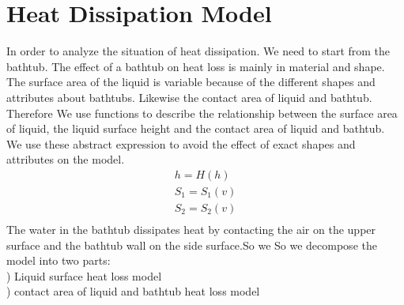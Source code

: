 \documentclass{mcmthesis}
\begin{document}
\section{Heat Dissipation Model}
In order to analyze the situation of heat dissipation. 
We need to start from the bathtub.
The effect of a bathtub on heat loss is mainly in material and shape.\\
\indent The surface area of the liquid is variable because of the different shapes and attributes about bathtubs. Likewise the contact area of liquid and bathtub. Therefore We use functions to describe the relationship between the surface area of liquid, the liquid surface height and the contact area of liquid and bathtub. \\
\indent We use these abstract expression to avoid the effect of exact shapes and attributes on the model.
\begin{equation}
\begin{split}
h=H(h)  \\
S_{1}=S_{1}(v) \\
S_{2}=S_{2}(v)  \\
\end{split}
\end{equation}
\indent The water in the bathtub dissipates heat by contacting the air on the upper surface and the bathtub wall on the side surface.So we So we decompose the model into two parts:\\
\indent {}) Liquid surface heat loss model\\
\indent {}) contact area of liquid and bathtub heat loss model
\end{document}
